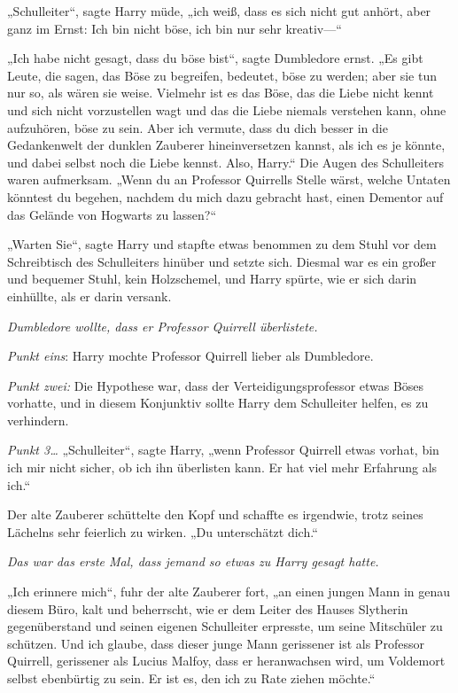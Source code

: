 {„Schulleiter“, sagte Harry müde, „ich weiß, dass es sich nicht gut anhört, aber ganz im Ernst: Ich bin nicht böse, ich bin nur sehr kreativ—“

„Ich habe nicht gesagt, dass du böse bist“, sagte Dumbledore ernst. „Es gibt Leute, die sagen, das Böse zu begreifen, bedeutet, böse zu werden; aber sie tun nur so, als wären sie weise. Vielmehr ist es das Böse, das die Liebe nicht kennt und sich nicht vorzustellen wagt und das die Liebe niemals verstehen kann, ohne aufzuhören, böse zu sein. Aber ich vermute, dass du dich besser in die Gedankenwelt der dunklen Zauberer hineinversetzen kannst, als ich es je könnte, und dabei selbst noch die Liebe kennst. Also, Harry.“ Die Augen des Schulleiters waren aufmerksam. „Wenn du an Professor Quirrells Stelle wärst, welche Untaten könntest du begehen, nachdem du mich dazu gebracht hast, einen Dementor auf das Gelände von Hogwarts zu lassen?“

„Warten Sie“, sagte Harry und stapfte etwas benommen zu dem Stuhl vor dem Schreibtisch des Schulleiters hinüber und setzte sich. Diesmal war es ein großer und bequemer Stuhl, kein Holzschemel, und Harry spürte, wie er sich darin einhüllte, als er darin versank.

\emph{Dumbledore wollte, dass er Professor Quirrell überlistete.}

\emph{Punkt eins}: Harry mochte Professor Quirrell lieber als Dumbledore.

\emph{Punkt zwei:} Die Hypothese war, dass der Verteidigungsprofessor etwas Böses vorhatte, und in diesem Konjunktiv sollte Harry dem Schulleiter helfen, es zu verhindern.

\emph{Punkt 3…} „Schulleiter“, sagte Harry, „wenn Professor Quirrell etwas vorhat, bin ich mir nicht sicher, ob ich ihn überlisten kann. Er hat viel mehr Erfahrung als ich.“

Der alte Zauberer schüttelte den Kopf und schaffte es irgendwie, trotz seines Lächelns sehr feierlich zu wirken. „Du unterschätzt dich.“

\emph{Das war das erste Mal, dass jemand so etwas zu Harry gesagt hatte.}

„Ich erinnere mich“, fuhr der alte Zauberer fort, „an einen jungen Mann in genau diesem Büro, kalt und beherrscht, wie er dem Leiter des Hauses Slytherin gegenüberstand und seinen eigenen Schulleiter erpresste, um seine Mitschüler zu schützen. Und ich glaube, dass dieser junge Mann gerissener ist als Professor Quirrell, gerissener als Lucius Malfoy, dass er heranwachsen wird, um Voldemort selbst ebenbürtig zu sein. Er ist es, den ich zu Rate ziehen möchte.“

}
